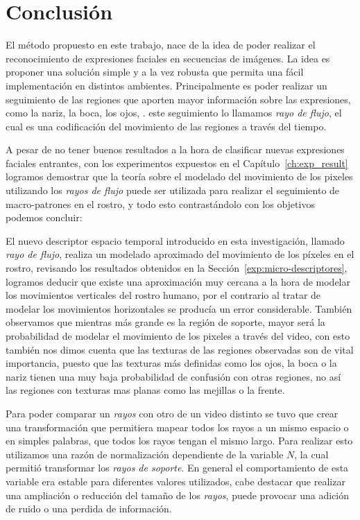 \chapter[Conclusión]{Conclusión}
\label{ch:conclusion}

El método propuesto en este trabajo, nace de la idea de poder realizar el reconocimiento de expresiones faciales en secuencias de imágenes. La idea es proponer una solución simple y a la vez robusta que permita una fácil implementación en distintos ambientes. Principalmente es poder realizar un seguimiento de las regiones que aporten mayor información sobre las expresiones, como la nariz, la boca, los ojos, \etc. este seguimiento lo llamamos \textit{rayo de flujo}, el cual es una codificación del movimiento de las regiones a través del tiempo.

A pesar de no tener buenos resultados a la hora de clasificar nuevas expresiones faciales entrantes, con los experimentos expuestos en el Capítulo~\ref{ch:exp_result} logramos demostrar que la teoría sobre el modelado del movimiento de los pixeles utilizando los \textit{rayos de flujo} puede ser utilizada para realizar el seguimiento de macro-patrones en el rostro, y todo esto contrastándolo con los objetivos podemos concluir:

El nuevo descriptor espacio temporal introducido en esta investigación, llamado \textit{rayo de flujo}, realiza un modelado aproximado del movimiento de los píxeles en el rostro, revisando los resultados obtenidos en la Sección~\ref{exp:micro-descriptores}, logramos deducir que existe una aproximación muy cercana a la hora de modelar los movimientos verticales del rostro humano, por el contrario al tratar de modelar los movimientos horizontales se producía un error considerable. También observamos que mientras más grande es la región de soporte, mayor será la probabilidad de modelar el movimiento de los pixeles a través del video, con esto también nos dimos cuenta que las texturas de las regiones observadas son de vital importancia, puesto que las texturas más definidas como los ojos, la boca o la nariz tienen una muy baja probabilidad de confusión con otras regiones, no así las regiones con texturas mas planas como las mejillas o la frente.

Para poder comparar un \textit{rayos} con otro de un video distinto se tuvo que crear una transformación que permitiera mapear todos los rayos a un mismo espacio o en simples palabras, que todos los rayos tengan el mismo largo. Para realizar esto utilizamos una razón de normalización dependiente de la variable $N$, la cual permitió transformar los \textit{rayos de soporte}. En general el comportamiento de esta variable era estable para diferentes valores utilizados, cabe destacar que realizar una ampliación o reducción del tamaño de los \textit{rayos}, puede provocar una adición de ruido o  una perdida de información. 

